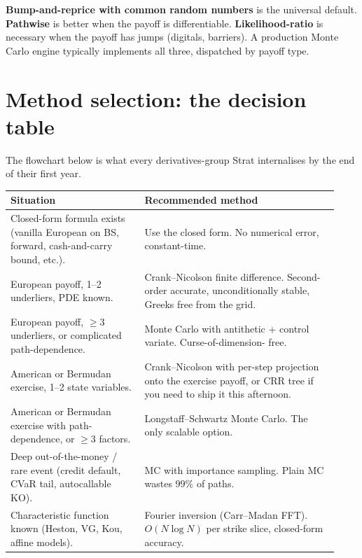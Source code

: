 \begin{keyfactbox}
\textbf{Bump-and-reprice with common random numbers} is the universal
default.  \textbf{Pathwise} is better when the payoff is
differentiable.  \textbf{Likelihood-ratio} is necessary when the
payoff has jumps (digitals, barriers).  A production Monte Carlo
engine typically implements all three, dispatched by payoff type.
\end{keyfactbox}


\section{Method selection: the decision table}
\label{sec:method_selection}

The flowchart below is what every derivatives-group Strat
internalises by the end of their first year.

\begin{center}
\small
\renewcommand{\arraystretch}{1.2}
\begin{tabular}{p{0.38\linewidth} | p{0.55\linewidth}}
\toprule
\textbf{Situation} & \textbf{Recommended method} \\
\midrule
Closed-form formula exists (vanilla European on BS, forward,
cash-and-carry bound, etc.).
& Use the closed form.  No numerical error, constant-time. \\
\midrule
European payoff, 1--2 underliers, PDE known.
& Crank--Nicolson finite difference.  Second-order accurate,
unconditionally stable, Greeks free from the grid. \\
\midrule
European payoff, $\geq 3$ underliers, or complicated path-dependence.
& Monte Carlo with antithetic + control variate.  Curse-of-dimension-
free. \\
\midrule
American or Bermudan exercise, 1--2 state variables.
& Crank--Nicolson with per-step projection onto the exercise payoff,
or CRR tree if you need to ship it this afternoon. \\
\midrule
American or Bermudan exercise with path-dependence, or $\geq 3$
factors.
& Longstaff--Schwartz Monte Carlo.  The only scalable option. \\
\midrule
Deep out-of-the-money / rare event (credit default, CVaR tail,
autocallable KO).
& MC with importance sampling.  Plain MC wastes $99\%$ of paths. \\
\midrule
Characteristic function known (Heston, VG, Kou, affine models).
& Fourier inversion (Carr--Madan FFT).  $O(N \log N)$ per strike
slice, closed-form accuracy. \\
\bottomrule
\end{tabular}
\end{center}

